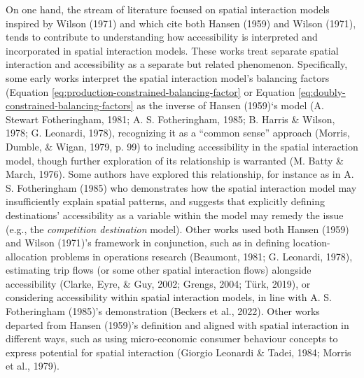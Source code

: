 \documentclass[
11pt, %
oneside, %
english, %
singlespacing, %
]{macthesis} %
\begin{document}
On one hand, the stream of literature focused on spatial interaction models inspired by Wilson (1971) and which cite both Hansen (1959) and Wilson (1971), tends to contribute to understanding how accessibility is interpreted and incorporated in spatial interaction models. These works treat separate spatial interaction and accessibility as a separate but related phenomenon. Specifically, some early works interpret the spatial interaction model's balancing factors (Equation \ref{eq:production-constrained-balancing-factor} or Equation \ref{eq:doubly-constrained-balancing-factors} as the inverse of Hansen (1959)`s model (A. Stewart Fotheringham, 1981; A. S. Fotheringham, 1985; B. Harris \& Wilson, 1978; G. Leonardi, 1978), recognizing it as a ``common sense'' approach (Morris, Dumble, \& Wigan, 1979, p. 99) to including accessibility in the spatial interaction model, though further exploration of its relationship is warranted (M. Batty \& March, 1976). Some authors have explored this relationship, for instance as in A. S. Fotheringham (1985) who demonstrates how the spatial interaction model may insufficiently explain spatial patterns, and suggests that explicitly defining destinations' accessibility as a variable within the model may remedy the issue (e.g., the \emph{competition destination} model). Other works used both Hansen (1959) and Wilson (1971)'s framework in conjunction, such as in defining location-allocation problems in operations research (Beaumont, 1981; G. Leonardi, 1978), estimating trip flows (or some other spatial interaction flows) alongside accessibility (Clarke, Eyre, \& Guy, 2002; Grengs, 2004; Türk, 2019), or considering accessibility within spatial interaction models, in line with A. S. Fotheringham (1985)'s demonstration (Beckers et al., 2022). Other works departed from Hansen (1959)'s definition and aligned with spatial interaction in different ways, such as using micro-economic consumer behaviour concepts to express potential for spatial interaction (Giorgio Leonardi \& Tadei, 1984; Morris et al., 1979).
\end{document}
